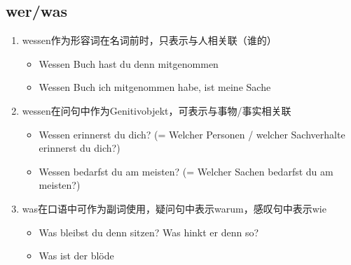 \documentclass[UTF8]{report}
\begin{document}
\subsection{wer/was}
\begin{enumerate}
    \item wessen作为形容词在名词前时，只表示与人相关联（谁的）
    \begin{itemize}
        \item Wessen Buch hast du denn mitgenommen
        \item Wessen Buch ich mitgenommen habe, ist meine Sache
    \end{itemize}
    \item wessen在问句中作为Genitivobjekt，可表示与事物/事实相关联
    \begin{itemize}
        \item Wessen erinnerst du dich? (= Welcher Personen / welcher Sachverhalte erinnerst du dich?)
        \item Wessen bedarfst du am meisten? (= Welcher Sachen bedarfst du am meisten?) 
    \end{itemize}
    \item was在口语中可作为副词使用，疑问句中表示warum，感叹句中表示wie
    \begin{itemize}
        \item Was bleibst du denn sitzen? Was hinkt er denn so? 
        \item Was ist der blöde
    \end{itemize}
\end{enumerate}
\end{document}
